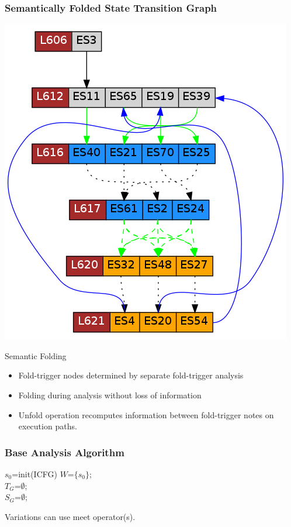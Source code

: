 \begin{frame}[fragile]
\frametitle{Semantically Folded State Transition Graph}

\begin{center}
\includegraphics[height=0.45\columnwidth]{example1gfx2/transitiongraph2}
\end{center}

\vspace{-0.3cm}
{
\scriptsize
\begin{block}{Semantic Folding}
\begin{itemize}
\item Fold-trigger nodes determined by separate fold-trigger analysis
\item Folding during analysis without loss of information
\item Unfold operation recomputes information between fold-trigger notes on execution paths.
\end{itemize}
\end{block}
}


\end{frame}


\begin{frame}[fragile]
\frametitle{Base Analysis Algorithm}
{
\scriptsize
\begin{algorithm}[H]
\SetLine
{}

$s_0$=init(ICFG) 
$W$=$\{s_0\}$; \\
$T_G$=$\emptyset$; \\
$S_G$=$\emptyset$; \\
\label{alg:general}
\end{algorithm}
}
{
\footnotesize
Variations can use meet operator(s).
}
\end{frame}

